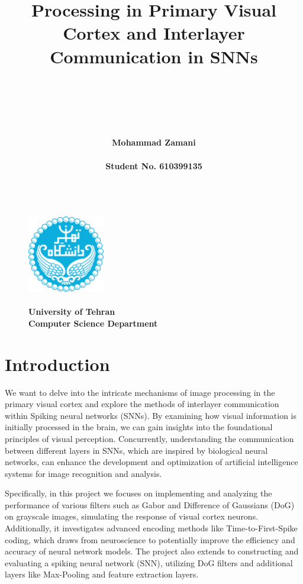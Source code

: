 \documentclass[12pt]{article}
\title{\textbf{\hugeImage Processing in Primary Visual Cortex and Interlayer Communication in SNNs}\\[1ex]  \\[1ex] \\[1ex]}
\author{\hfill \\ \textbf{\Large{ Mohammad Zamani}} \\ \\  \hfill \textbf{\Large{Student No. 610399135} \\ \\}}
\date{}
\begin{document}

	
	\begin{titlingpage}
	
	\begin{figure}
		\centering
		\includegraphics[width=0.3\textwidth]{Figs/University_of_Tehran_logo.png}		
		\caption*{ \textbf{\Large \\ University of Tehran\\ Computer Science Department \\}}
	\end{figure}		\maketitle
	
	\end{titlingpage}



	\setlength{\parindent}{20pt}
	\tableofcontents
	
	\vspace{1\baselineskip}

	\pagebreak

	\section{Introduction}
	
	We want to delve into the intricate mechanisms of image processing in the primary visual cortex and explore the methods of interlayer communication within Spiking neural networks (SNNs). By examining how visual information is initially processed in the brain, we can gain insights into the foundational principles of visual perception. Concurrently, understanding the communication between different layers in SNNs, which are inspired by biological neural networks, can enhance the development and optimization of artificial intelligence systems for image recognition and analysis.

Specifically, in this project we focuses on implementing and analyzing the performance of various filters such as Gabor and Difference of Gaussians (DoG) on grayscale images, simulating the response of visual cortex neurons. Additionally, it investigates advanced encoding methods like Time-to-First-Spike coding, which draws from neuroscience to potentially improve the efficiency and accuracy of neural network models. The project also extends to constructing and evaluating a spiking neural network (SNN), utilizing DoG filters and additional layers like Max-Pooling and feature extraction layers.
\end{document}
